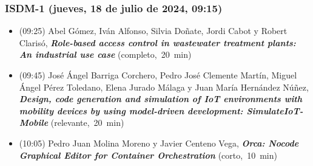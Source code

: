 \begin{frame}
  \frametitle{ISDM-1 (jueves, 18 de julio de 2024, 09:15)}
\begin{itemize}


\item {(09:25) Abel Gómez, Iván Alfonso, Silvia Doñate, Jordi Cabot y Robert Clarisó}, %
      {\bfseries\itshape Role-based access control in wastewater treatment plants: An industrial use case} %
      {(completo,~20~min)}
      

\item {(09:45) José Ángel Barriga Corchero, Pedro José Clemente Martín, Miguel Ángel Pérez Toledano, Elena Jurado Málaga y Juan María Hernández Núñez}, %
      {\bfseries\itshape Design, code generation and simulation of IoT environments with mobility devices by using model-driven development: SimulateIoT-Mobile} %
      {(relevante,~20~min)}
      

\item {(10:05) Pedro Juan Molina Moreno y Javier Centeno Vega}, %
      {\bfseries\itshape Orca: Nocode Graphical Editor for Container Orchestration} %
      {(corto,~10~min)}
      

\end{itemize}
\end{frame}